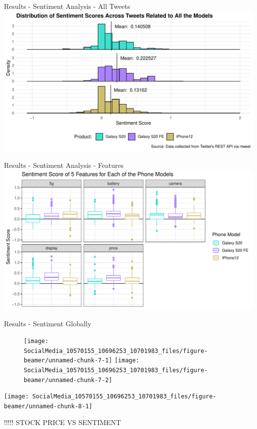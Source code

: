 \documentclass[
  ignorenonframetext,
]{beamer}
\begin{document}
\begin{frame}{Results - Sentiment Analysis - All Tweets}
\protect\hypertarget{results---sentiment-analysis---all-tweets}{}
\includegraphics{SocialMedia_10570155_10696253_10701983_files/figure-beamer/unnamed-chunk-3-1.pdf}
\end{frame}

\begin{frame}{Results - Sentiment Analysis - Features}
\protect\hypertarget{results---sentiment-analysis---features}{}
\includegraphics{SocialMedia_10570155_10696253_10701983_files/figure-beamer/unnamed-chunk-5-1.pdf}
\end{frame}

\begin{frame}{Results - Sentiment Globally}
\protect\hypertarget{results---sentiment-globally}{}
\begin{figure}

{\centering \texttt{[image: SocialMedia\_10570155\_10696253\_10701983\_files/figure-beamer/unnamed-chunk-7-1]} \texttt{[image: SocialMedia\_10570155\_10696253\_10701983\_files/figure-beamer/unnamed-chunk-7-2]} 

}

\end{figure}

\begin{center}\texttt{[image: SocialMedia\_10570155\_10696253\_10701983\_files/figure-beamer/unnamed-chunk-8-1]} \end{center}

!!!!! STOCK PRICE VS SENTIMENT
\end{frame}
\end{document}
